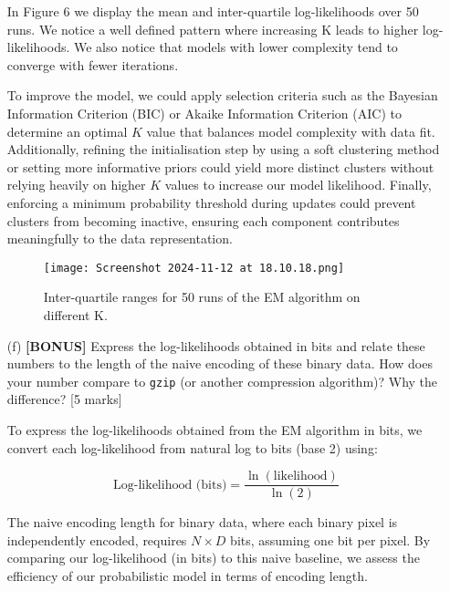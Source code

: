 \documentclass{article}
\begin{document}
\begin{enumerate}
    In Figure 6 we display the mean and inter-quartile log-likelihoods over 50 runs. We notice a well defined pattern where increasing K leads to higher log-likelihoods. We also notice that models with lower complexity tend to converge with fewer iterations. 

    \vspace{0.8em}

    To improve the model, we could apply selection criteria such as the Bayesian Information Criterion (BIC) or Akaike Information Criterion (AIC) to determine an optimal $K$ value that balances model complexity with data fit. Additionally, refining the initialisation step by using a soft clustering method or setting more informative priors could yield more distinct clusters without relying heavily on higher $K$ values to increase our model likelihood. Finally, enforcing a minimum probability threshold during updates could prevent clusters from becoming inactive, ensuring each component contributes meaningfully to the data representation.

    \begin{figure}[H]
        \centering
        \texttt{[image: Screenshot 2024-11-12 at 18.10.18.png]}
        \caption{Inter-quartile ranges for 50 runs of the EM algorithm on different K.}
        \label{fig:enter-label}
    \end{figure}

    \vspace{10pt}

    \item[(f)] \textbf{[BONUS]} Express the log-likelihoods obtained in bits and relate these numbers to the length of the naive encoding of these binary data. How does your number compare to \texttt{gzip} (or another compression algorithm)? Why the difference? [5 marks]

    \vspace{5pt}

    To express the log-likelihoods obtained from the EM algorithm in bits, we convert each log-likelihood from natural log to bits (base 2) using:
    
    \[
    \text{Log-likelihood (bits)} = \frac{\ln(\text{likelihood})}{\ln(2)}
    \]
    
    The naive encoding length for binary data, where each binary pixel is independently encoded, requires \( N \times D \) bits, assuming one bit per pixel. By comparing our log-likelihood (in bits) to this naive baseline, we assess the efficiency of our probabilistic model in terms of encoding length.


\end{enumerate}
\end{document}
